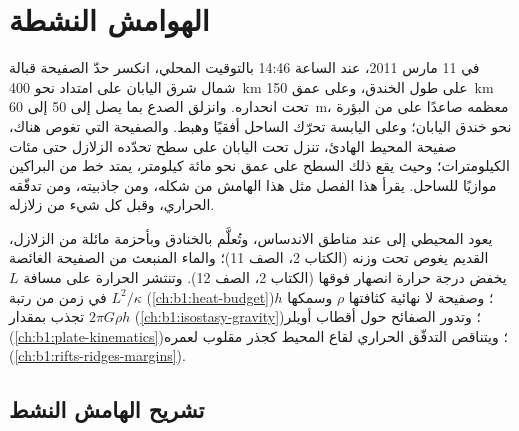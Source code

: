 \chapter{الهوامش النشطة}\label{ch:b1:active-margins}

في 11 مارس 2011، عند الساعة 14:46 بالتوقيت المحلي، انكسر حدّ الصفيحة قبالة شمال شرق اليابان على امتداد نحو \qty{400}{km} على طول الخندق، وعلى عمق \qty{150}{km} تحت انحداره. وانزلق الصدع بما يصل إلى 50 إلى \qty{60}{m}، معظمه صاعدًا على  من البؤرة نحو خندق اليابان؛ وعلى اليابسة تحرّك الساحل أفقيًا وهبط. والصفيحة التي تغوص هناك، صفيحة المحيط الهادئ، تنزل تحت اليابان على سطح تحدّده الزلازل حتى مئات الكيلومترات؛ وحيث يقع ذلك السطح على عمق نحو مائة كيلومتر، يمتد خط من البراكين موازيًا للساحل. يقرأ هذا الفصل مثل هذا الهامش من شكله، ومن جاذبيته، ومن تدفّقه الحراري، وقبل كل شيء من زلازله.

\begin{recall}
يعود  المحيطي إلى  عند مناطق الاندساس، وتُعلَّم بالخنادق وبأحزمة مائلة من الزلازل،  القديم يغوص تحت وزنه (الكتاب 2، الصف 11)؛ والماء المنبعث من الصفيحة الغائصة يخفض درجة حرارة انصهار  فوقها (الكتاب 2، الصف 12). وتنتشر الحرارة على مسافة $L$ في زمن من رتبة $L^2/\kappa$ (\cref{ch:b1:heat-budget})؛ وصفيحة لا نهائية كثافتها $\rho$ وسمكها $h$ تجذب بمقدار $2\pi G\rho h$ (\cref{ch:b1:isostasy-gravity})؛ وتدور الصفائح حول أقطاب أويلر (\cref{ch:b1:plate-kinematics})؛ ويتناقص التدفّق الحراري لقاع المحيط كجذر مقلوب لعمره (\cref{ch:b1:rifts-ridges-margins}).
\end{recall}

\section{تشريح الهامش النشط}\label{sec:b1:active-margins:anatomy}

